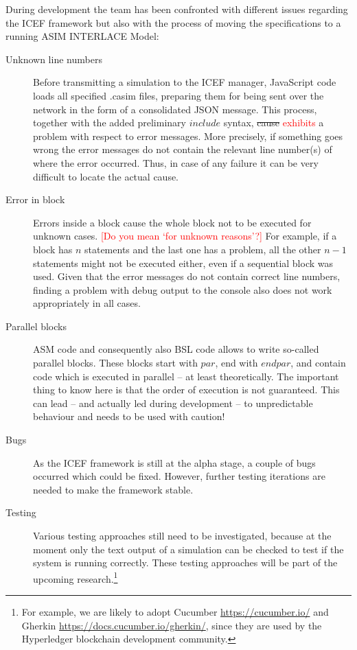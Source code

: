 During development the team has been confronted with different issues regarding the ICEF framework but also with the process of moving the specifications to a running ASIM INTERLACE Model:
\begin{description}
	\item[Unknown line numbers] Before transmitting a simulation to the ICEF manager, JavaScript code loads all specified .casim files, preparing them for being sent over the network in the form of a consolidated JSON message. This process, together with the added preliminary $include$ syntax, \st{cause} \textcolor{red}{exhibits} a problem with respect to error messages. More precisely, if something goes wrong the error messages do not contain the relevant line number(s) of where the error occurred. Thus, in case of any failure it can be very difficult to locate the actual cause.
	\item[Error in block] Errors inside a block cause the whole block not to be executed for unknown cases. \textcolor{red}{[Do you mean `for unknown reasons'?]} For example, if a block has $n$ statements and the last one has a problem, all the other $n - 1$ statements might not be executed either, even if a sequential block was used. Given that the error messages do not contain correct line numbers, finding a problem with debug output to the console also does not work appropriately in all cases.
	\item[Parallel blocks] ASM code and consequently also BSL code allows to write so-called parallel blocks. These blocks start with $par$, end with $endpar$, and contain code which is executed in parallel -- at least theoretically. The important thing to know here is that the order of execution is not guaranteed. This can lead -- and actually led during development -- to unpredictable behaviour and needs to be used with caution!
	\item[Bugs] As the ICEF framework is still at the alpha stage, a couple of bugs occurred which could be fixed. However, further testing iterations are needed to make the framework stable.
	\item[Testing] Various testing approaches still need to be investigated, because at the moment only the text output of a simulation can be checked to test if the system is running correctly. These testing approaches will be part of the upcoming research.\footnote{For example, we are likely to adopt Cucumber \url{https://cucumber.io/} and Gherkin \url{https://docs.cucumber.io/gherkin/}, since they are used by the Hyperledger blockchain development community.}

\end{description}
